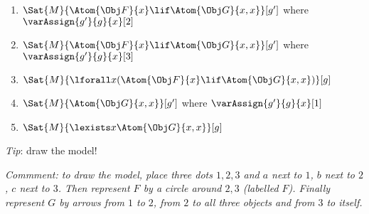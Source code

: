 \documentclass[../../../../include/open-logic-section]{subfiles}
\begin{document}
\begin{prob}
\begin{enumerate}
	\item $\Sat{M}{\Atom{\Obj F}{x}\lif \Atom{\Obj G}{x,x}}[g']$ where $\varAssign{g'}{g}{x}[2]$
	\item $\Sat{M}{\Atom{\Obj F}{x}\lif \Atom{\Obj G}{x,x}}[g']$ where $\varAssign{g'}{g}{x}[3]$
	\item $\Sat{M}{\lforall x(\Atom{\Obj F}{x}\lif \Atom{\Obj G}{x,x})}[g]$
	\item $\Sat{M}{\Atom{\Obj G}{x,x}}[g']$ where $\varAssign{g'}{g}{x}[1]$
	\item $\Sat{M}{\lexists x\Atom{\Obj G}{x,x}}[g]$
\end{enumerate}
\emph{Tip}: draw the model! 
\begin{ans}
\emph{Commment: to draw the model, place three dots $1,2,3$ and $a$ next to $1$, $b$ 
next to $2$, $c$ next to $3$. Then represent $F$ by a circle around $2,3$ (labelled $F$). 
Finally represent $G$ by arrows from $1$ to $2$, from $2$ to all three objects and from
$3$ to itself.}


\end{ans}
\end{prob}
\end{document}
